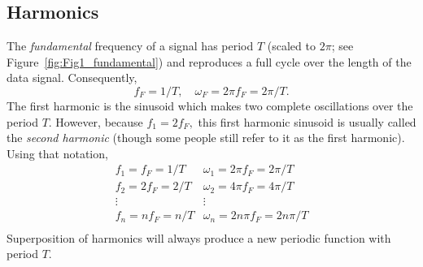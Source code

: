 \subsection{Harmonics}

The \emph{fundamental} frequency of a signal has period $T$ (scaled to $2\pi$; see Figure~\ref{fig:Fig1_fundamental})
and reproduces a full cycle over the length of the data signal.  Consequently, 
\begin{equation}
f_{F} = 1/T, \quad \omega_{F} = 2 \pi f_{F} = 2 \pi/T.
\end{equation}
The first harmonic is the sinusoid which makes two complete oscillations over the period $T$.  However, 
because $f_1 = 2f_F,$ this first harmonic sinusoid is usually called the \emph{second harmonic} (though 
some people still refer to it as the first harmonic).  Using that notation,
\begin{equation}
\begin{array}{ll}
f_1 = f_F = 1/T & \omega_{1} = 2\pi f_F = 2\pi/T\\
f_2 = 2f_F = 2/T & \omega_{2} = 4\pi f_F = 4\pi/T\\
\vdots & \vdots \\
f_n = nf_F = n/T & \omega_{n} = 2n\pi f_F= 2n\pi/T\\
\end{array}
\end{equation} 
Superposition of harmonics will always produce a new periodic function with period $T$.

